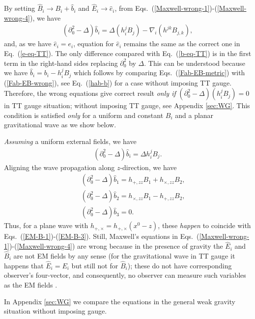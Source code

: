 \documentclass[twocolumn,amsmath,amssymb]{revtex4}
\newcommand{\bea}{\begin{eqnarray}}
\newcommand{\eea}{\end{eqnarray}}
\begin{document}
By setting $\hat B_i \rightarrow B_i + \hat b_i$ and $\hat E_i \rightarrow \hat e_i$, from Eqs.\ (\ref{Maxwell-wrong-1})-(\ref{Maxwell-wrong-4}), we have
\bea
   ( \partial_0^2 - \Delta ) \hat b_i
       = \Delta ( h_i^j B_j )
       - \nabla_i ( h^{jk} B_{j,k} ),
   \label{b-eq-TT-wrong}
\eea
and, as we have $\hat e_i = e_i$, equation for $\hat e_i$ remains the same as the correct one in Eq.\ (\ref{e-eq-TT}). The only difference compared with Eq.\ (\ref{b-eq-TT}) is in the first term in the right-hand sides replacing $\partial_0^2$ by $\Delta$. This can be understood because we have $\hat b_i = b_i - h_i^j B_j$ which follows by comparing Eqs.\ (\ref{Fab-EB-metric}) with (\ref{Fab-EB-wrong}), see Eq.\ (\ref{hab-b}) for a case without imposing TT gauge. Therefore, the wrong equations give correct result {\it only if} $( \partial_0^2 - \Delta ) (h_i^j B_j) = 0$ in TT gauge situation; without imposing TT gauge, see Appendix \ref{sec:WG}. This condition is satisfied {\it only} for a uniform and constant $B_i$ and a planar gravitational wave as we show below.

{\it Assuming} a uniform external fields, we have
\bea
   ( \partial_0^2 - \Delta ) \hat b_i
       = \Delta h_i^j B_j.
\eea
Aligning the wave propagation along $z$-direction, we have
\bea
   & & ( \partial_0^2 - \Delta ) \hat b_1
       = h_{+,zz} B_1 + h_{\times,zz} B_2,
   \label{EM-B-wrong-1} \\
   & & ( \partial_0^2 - \Delta ) \hat b_2
       = h_{\times,zz} B_1 - h_{+,zz} B_2,
   \label{EM-B-wrong-2} \\
   & & ( \partial_0^2 - \Delta ) \hat b_3
       = 0.
   \label{EM-B-wrong-3}
\eea
Thus, for a plane wave with $h_{+,\times} = h_{+,\times} (x^0 - z)$, these {\it happen} to coincide with Eqs.\ (\ref{EM-B-1})-(\ref{EM-B-3}). Still, Maxwell's equations in Eqs.\ (\ref{Maxwell-wrong-1})-(\ref{Maxwell-wrong-4}) are wrong because in the presence of gravity the $\hat E_i$ and $\hat B_i$ are not EM fields by any sense (for the gravitational wave in TT gauge it happens that $\hat E_i = E_i$ but still not for $\hat B_i$); these do not have corresponding observer's four-vector, and consequently, no observer can measure such variables as the EM fields \cite{EM-definition, Hwang-Noh-2023-EM-NL}.

In Appendix \ref{sec:WG} we compare the equations in the general weak gravity situation without imposing gauge.
\end{document}
